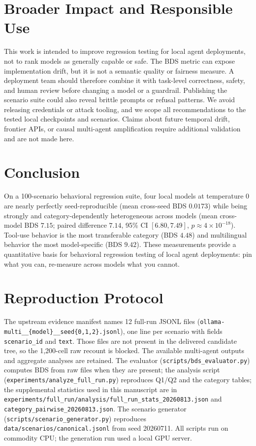 \documentclass[11pt]{article}
\begin{document}
\section{Broader Impact and Responsible Use}
\label{sec:broader}

This work is intended to improve regression testing for local agent
deployments, not to rank models as generally capable or safe. The BDS metric
can expose implementation drift, but it is not a semantic quality or fairness
measure. A deployment team should therefore combine it with task-level
correctness, safety, and human review before changing a model or a guardrail.
Publishing the scenario suite could also reveal brittle prompts or refusal
patterns. We avoid releasing credentials or attack tooling, and we scope all
recommendations to the tested local checkpoints and scenarios. Claims about
future temporal drift, frontier APIs, or causal multi-agent amplification
require additional validation and are not made here.

\section{Conclusion}
\label{sec:conclusion}

On a 100-scenario behavioral regression suite, four local models at
temperature 0 are nearly perfectly seed-reproducible (mean cross-seed BDS
$0.0173$) while being strongly and category-dependently heterogeneous
across models (mean cross-model BDS $7.15$; paired difference $7.14$, 95\%
CI $[6.80, 7.49]$, $p \approx 4\times10^{-18}$). Tool-use behavior is the
most transferable category (BDS $4.48$) and multilingual behavior the most
model-specific (BDS $9.42$). These measurements provide a quantitative basis for
behavioral regression testing of local agent deployments: pin what you
can, re-measure across models what you cannot.




\appendix
\section{Reproduction Protocol}
\label{app:repro}

The upstream evidence manifest names 12 full-run JSONL files
(\texttt{ollama-multi\_\_\{model\}\_\_seed\{0,1,2\}.jsonl}), one line per
scenario with fields \texttt{scenario\_id} and \texttt{text}. Those files are
not present in the delivered candidate tree, so the 1,200-cell raw recount is
blocked. The available multi-agent outputs and aggregate analyses are
retained. The evaluator (\texttt{scripts/bds\_evaluator.py}) computes BDS from
raw files when they are present; the analysis script
(\texttt{experiments/analyze\_full\_run.py}) reproduces Q1/Q2 and the
category tables; the supplemental statistics used in this manuscript are
in
\texttt{experiments/full\_run/analysis/full\_run\_stats\_20260813.json} and
\texttt{category\_pairwise\_20260813.json}. The scenario generator
(\texttt{scripts/scenario\_generator.py}) reproduces
\texttt{data/scenarios/canonical.jsonl} from seed 20260711. All scripts run
on commodity CPU; the generation run used a local GPU server.
\end{document}
